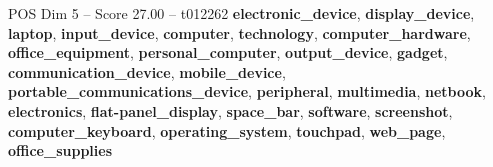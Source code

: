 \begin{textsample}{POS Dim 5 – Score 27.00 – t012262}  \label{ex:f5_pos_029}
\textbf{electronic\_device}, \textbf{display\_device}, \textbf{laptop}, \textbf{input\_device}, \textbf{computer}, \textbf{technology}, \textbf{computer\_hardware}, \textbf{office\_equipment}, \textbf{personal\_computer}, \textbf{output\_device}, \textbf{gadget}, \textbf{communication\_device}, \textbf{mobile\_device}, \textbf{portable\_communications\_device}, \textbf{peripheral}, \textbf{multimedia}, \textbf{netbook}, \textbf{electronics}, \textbf{flat-panel\_display}, \textbf{space\_bar}, \textbf{software}, \textbf{screenshot}, \textbf{computer\_keyboard}, \textbf{operating\_system}, \textbf{touchpad}, \textbf{web\_page}, \textbf{office\_supplies}

\end{textsample}
